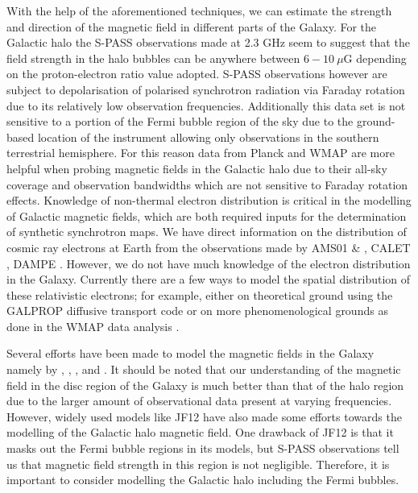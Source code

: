 \documentclass[usenatbib]{mnras}
\begin{document}
With the help of the aforementioned techniques, we can estimate the strength and direction of the magnetic field in different parts of the Galaxy. 
For the Galactic halo the S-PASS \cite{Carretti_2013} observations  made at 2.3 GHz seem to suggest that the field strength in the halo bubbles can be anywhere between $6-10~\mu $G depending on the proton-electron ratio value adopted. S-PASS \cite{Carretti_2013} observations however are subject to depolarisation of polarised synchrotron radiation via Faraday rotation due to its relatively low observation frequencies. Additionally this data set is not sensitive to a portion of the Fermi bubble region of the sky due to the ground-based location of the instrument allowing only observations in the southern terrestrial hemisphere. For this reason data from Planck and WMAP are more helpful when probing magnetic fields in the Galactic halo due to their all-sky coverage and observation bandwidths which are not sensitive to Faraday rotation effects.
Knowledge of non-thermal electron distribution is critical in the modelling of Galactic magnetic fields, which are both required inputs for the determination of synthetic synchrotron maps.
We have direct information on the distribution of cosmic ray electrons at Earth from the observations made by AMS01 \cite{AMS_2002} \& \cite{AMS_2014}, CALET \cite{Calet_2017}, DAMPE \cite{Dampe_2017}. However, we do not have much knowledge of the electron distribution in the Galaxy.
Currently there are a few ways to model the spatial distribution of these relativistic electrons; for example, either on theoretical ground using the GALPROP diffusive transport code \cite{Hammurabi} \cite{Orlando_2011} or on more phenomenological grounds as done in the WMAP data analysis \cite{WMAP_Page}.


Several efforts have  been made to model the magnetic fields in the Galaxy namely by \cite{Jaffe_2010}, \cite{Jaffe_2011}, \cite{Sun_2008}, and \cite{JF12}. It should be noted that our understanding of the magnetic field in the disc region of the Galaxy is much better than that of the halo region due to the larger amount of observational data present at varying frequencies. However, widely used models like JF12 \cite{JF12} have also made some efforts towards the modelling of the Galactic halo magnetic field. One drawback of JF12 \cite{JF12} is that it masks out the Fermi bubble regions in its models, but S-PASS \cite{Carretti_2013} observations tell us that magnetic field strength in this region is not negligible. Therefore, it is important to consider modelling the Galactic halo including the Fermi bubbles.
\end{document}
